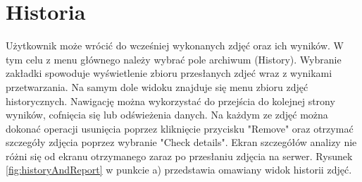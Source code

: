 \section{Historia}{
Użytkownik może wrócić do wcześniej wykonanych zdjęć oraz ich wyników. W tym celu z menu głównego należy wybrać pole archiwum (History). Wybranie zakładki spowoduje wyświetlenie zbioru przesłanych zdjeć wraz z wynikami przetwarzania. Na samym dole widoku znajduje się menu zbioru zdjęć historycznych. Nawigację można wykorzystać do przejścia do kolejnej strony wyników, cofnięcia się lub odświeżenia danych. Na każdym ze zdjęć można dokonać operacji usunięcia poprzez kliknięcie przycisku "Remove" oraz otrzymać szczegóły zdjęcia poprzez wybranie "Check details". Ekran szczegółów analizy nie różni się od ekranu otrzymanego zaraz po przesłaniu zdjęcia na serwer. Rysunek \ref{fig:historyAndReport} w punkcie a) przedstawia omawiany widok historii zdjęć.
}
